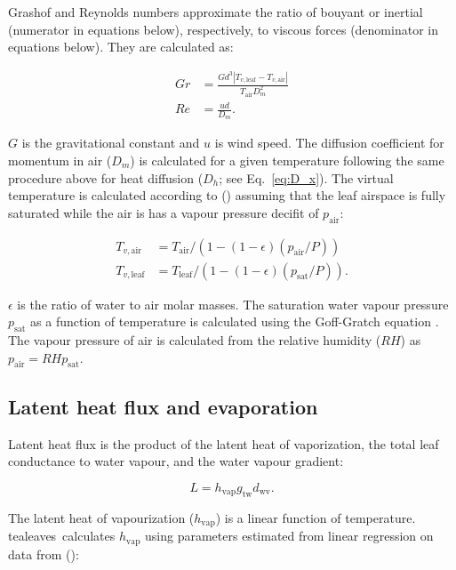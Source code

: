 \documentclass[11pt, oneside]{article}
\newcommand{\pkg}[1]{{\fontseries{b}\selectfont #1}}
\newcommand{\tealeaves}{\pkg{tealeaves}}
\begin{document}
Grashof and Reynolds numbers approximate the ratio of bouyant or inertial (numerator in equations below), respectively, to viscous forces (denominator in equations below). They are calculated as:

\begin{align} \label{eq:GrRe}
  \mathit{Gr} & = \frac{G d ^ 3 |T_{v,\mathrm{leaf}} - T_{v,\mathrm{air}}|}{T_\mathrm{air} D_m ^ 2} \\
  \mathit{Re} & = \frac{u d}{D_m}.
\end{align}

$G$ is the gravitational constant and $u$ is wind speed. The diffusion coefficient for momentum in air ($D_m$) is calculated for a given temperature following the same procedure above for heat diffusion ($D_h$; see Eq.~\ref{eq:D_x}). The virtual temperature is calculated according to \citeauthor{Monteith_Unsworth_2013} (\citeyear{Monteith_Unsworth_2013}) assuming that the leaf airspace is fully saturated while the air is has a vapour pressure decifit of $p_\mathrm{air}$:

\begin{align} \label{eq:Tv}
  T_{v, \mathrm{air}} & = T_\mathrm{air} / (1 - (1 - \epsilon) (p_\mathrm{air} / P)) \\
  T_{v, \mathrm{leaf}} & = T_\mathrm{leaf} / (1 - (1 - \epsilon) (p_\mathrm{sat} / P)).
\end{align}

$\epsilon$ is the ratio of water to air molar masses. The saturation water vapour pressure $p_\mathrm{sat}$ as a function of temperature is calculated using the Goff-Gratch equation \citep{Vomel_2016}. The vapour pressure of air is calculated from the relative humidity ($\mathit{RH}$) as $p_\mathrm{air} = \mathit{RH} p_\mathrm{sat}$.

\subsection*{Latent heat flux and evaporation}

Latent heat flux is the product of the latent heat of vaporization, the total leaf conductance to water vapour, and the water vapour gradient:

\begin{equation}
  L = h_\mathrm{vap} g_\mathrm{tw} d_\mathrm{wv}.
\end{equation}

The latent heat of vapourization ($h_\mathrm{vap}$) is a linear function of temperature. \tealeaves~calculates $h_\mathrm{vap}$ using parameters estimated from linear regression on data from \citeauthor{Nobel_2009} (\citeyear{Nobel_2009}):
\end{document}
